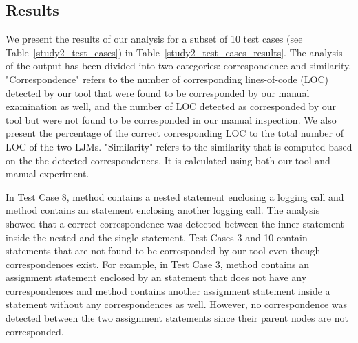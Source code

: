 \subsection{Results}  \label{study2-results}
We present the results of our analysis for a subset of 10 test cases (see Table~\ref{study2_test_cases}) in Table~\ref{study2_test_cases_results}. The analysis of the output has been divided into two categories: correspondence and similarity. "Correspondence" refers to the number of corresponding lines-of-code (LOC) detected by our tool that were found to be corresponded by our manual examination as well, and the number of LOC detected as corresponded by our tool but were not found to be corresponded in our manual inspection. We also present the percentage of the correct corresponding LOC to the total number of LOC of the two LJMs. "Similarity" refers to the similarity that is computed based on the the detected correspondences. It is calculated using both our tool and manual experiment.


In Test Case 8,  method contains a nested statement enclosing a logging call and  method contains an  statement enclosing another logging call. The analysis showed that a correct correspondence was detected between the inner statement inside the nested  and the single  statement. Test Cases 3 and 10 contain statements that are not found to be corresponded by our tool even though correspondences exist. For example, in Test Case 3,  method contains an assignment statement enclosed by an  statement that does not have any correspondences and  method contains another assignment statement inside a  statement without any correspondences as well. However, no correspondence was detected between the two assignment statements since their parent nodes are not corresponded.    

